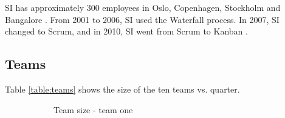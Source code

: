 \documentclass[UKenglish]{ifimaster}  %
\begin{document}
SI has approximately 300 employees in Oslo, Copenhagen, Stockholm and Bangalore \parencite{SI}. From 2001 to 2006, SI used the Waterfall process. In 2007, SI changed to Scrum, and in 2010, SI went from Scrum to Kanban \parencite{Dag}.
\subsection{Teams}
Table \ref{table:teams} shows the size of the ten teams vs. quarter.

\begin{figure}
\begin{subfigure}[b]{.2\textwidth}
\center
\caption{Team size - team one}
 \label{Team:1}
\end{subfigure}
\begin{subfigure}[b]{.2\textwidth}
\center
\end{subfigure}
\end{figure}
\end{document}
